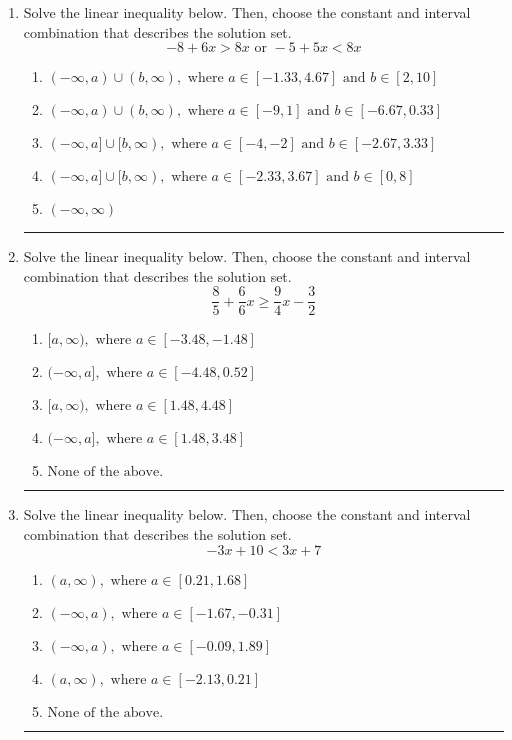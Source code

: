 \documentclass[14pt]{extbook}
\newcommand{\litem}[1]{\item#1\hspace*{-1cm}\rule{\textwidth}{0.4pt}}
\begin{document}
\begin{enumerate}
{\begin{enumerate}[label=\Alph*.]
\end{enumerate} }
\litem{
Solve the linear inequality below. Then, choose the constant and interval combination that describes the solution set.\[ -8 + 6 x > 8 x \text{ or } -5 + 5 x < 8 x \]\begin{enumerate}[label=\Alph*.]
\item \( (-\infty, a) \cup (b, \infty), \text{ where } a \in [-1.33, 4.67] \text{ and } b \in [2, 10] \)
\item \( (-\infty, a) \cup (b, \infty), \text{ where } a \in [-9, 1] \text{ and } b \in [-6.67, 0.33] \)
\item \( (-\infty, a] \cup [b, \infty), \text{ where } a \in [-4, -2] \text{ and } b \in [-2.67, 3.33] \)
\item \( (-\infty, a] \cup [b, \infty), \text{ where } a \in [-2.33, 3.67] \text{ and } b \in [0, 8] \)
\item \( (-\infty, \infty) \)

\end{enumerate} }
\litem{
Solve the linear inequality below. Then, choose the constant and interval combination that describes the solution set.\[ \frac{8}{5} + \frac{6}{6} x \geq \frac{9}{4} x - \frac{3}{2} \]\begin{enumerate}[label=\Alph*.]
\item \( [a, \infty), \text{ where } a \in [-3.48, -1.48] \)
\item \( (-\infty, a], \text{ where } a \in [-4.48, 0.52] \)
\item \( [a, \infty), \text{ where } a \in [1.48, 4.48] \)
\item \( (-\infty, a], \text{ where } a \in [1.48, 3.48] \)
\item \( \text{None of the above}. \)

\end{enumerate} }
\litem{
Solve the linear inequality below. Then, choose the constant and interval combination that describes the solution set.\[ -3x + 10 < 3x + 7 \]\begin{enumerate}[label=\Alph*.]
\item \( (a, \infty), \text{ where } a \in [0.21, 1.68] \)
\item \( (-\infty, a), \text{ where } a \in [-1.67, -0.31] \)
\item \( (-\infty, a), \text{ where } a \in [-0.09, 1.89] \)
\item \( (a, \infty), \text{ where } a \in [-2.13, 0.21] \)
\item \( \text{None of the above}. \)


\end{enumerate}}
\end{enumerate}
\end{document}
